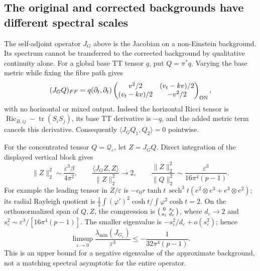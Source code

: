 \documentclass[a4paper,11pt]{article}
\numberwithin{equation}{section}
\theoremstyle{definition}
\newcommand{\Ric}{\operatorname{Ric}}
\newcommand{\tr}{\operatorname{tr}}
\begin{document}
\subsection{The original and corrected backgrounds have different spectral scales}
The self-adjoint operator $J_G$ above is the Jacobian on a non-Einstein
background. Its spectrum cannot be transferred to the corrected background
by qualitative continuity alone. For a global base TT tensor $q$, put
$Q=\pi^*q$. Varying the base metric while fixing the fibre path gives
\[
(J_GQ)_{FF}=q(\partial_t,\partial_t)
\begin{pmatrix}
v^2/2&(v_t-kv)/2\\
(v_t-kv)/2&-v^2/2
\end{pmatrix}_{\rm ON},
\]
with no horizontal or mixed output. Indeed the horizontal Ricci tensor is
$\Ric_{B,ij}-\tr(S_iS_j)$, its base TT derivative is $-q$,
and the added metric term cancels this derivative.
Consequently $\langle J_GQ_1,Q_2\rangle=0$ pointwise.

For the concentrated tensor $Q=\mathcal Q_\varepsilon$, let $Z=J_GQ$.
Direct integration of the displayed vertical block gives
\[
\|Z\|_2^2\sim\frac{\varepsilon^3\beta}{4\pi^2},\qquad
\frac{\langle J_GZ,Z\rangle}{\|Z\|_2^2}\longrightarrow2,\qquad
\frac{\|Z\|_2^2}{\|Q\|_2^2}
\sim\frac{\varepsilon^3}{16\pi^4(p-1)}.
\]
For example the leading tensor in $Z/\varepsilon$ is
$-c_0r\tanh t\,\operatorname{sech}^3t
(e^2\otimes e^3+e^3\otimes e^2)$; its radial Rayleigh quotient is
$\tfrac12\int(\varphi')^2\cosh t/\int\varphi^2\cosh t=2$.
On the orthonormalized span of $Q,Z$, the compression is
$\begin{psmallmatrix}0&s_\varepsilon\\s_\varepsilon&d_\varepsilon\end{psmallmatrix}$,
where $d_\varepsilon\to2$ and
$s_\varepsilon^2\sim\varepsilon^3/[16\pi^4(p-1)]$.
The smaller eigenvalue is $-s_\varepsilon^2/d_\varepsilon+o(s_\varepsilon^2)$;
hence
\begin{equation}\label{eq:ED-original-ritz}
\limsup_{\varepsilon\to0}
\frac{\lambda_{\min}(J_{G_\varepsilon})}{\varepsilon^3}
\le-\frac1{32\pi^4(p-1)}.
\end{equation}
This is an upper bound for a negative eigenvalue of the approximate
background, not a matching spectral asymptotic for the entire operator.
\end{document}
